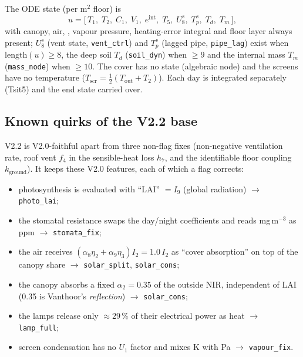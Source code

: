 \documentclass[11pt,a4paper]{article}
\begin{document}
The ODE state (per m$^2$ floor) is
\begin{equation}
u=\bigl[\,T_1,\;T_2,\;C_1,\;V_1,\;e^{\text{int}},\;T_5,\;U_8^{s},\;T_{p}^{s},\;T_{d},\;T_{m}\,\bigr],
\end{equation}
with canopy, air, , vapour pressure, heating-error integral and floor layer always present;
$U_8^s$ (vent state, \texttt{vent\_ctrl}) and $T_p^s$ (lagged pipe, \texttt{pipe\_lag}) exist when
$\mathrm{length}(u)\ge 8$, the deep soil $T_d$ (\texttt{soil\_dyn}) when $\ge 9$ and the internal mass $T_m$
(\texttt{mass\_node}) when $\ge 10$. The cover has no state (algebraic node) and the screens have no
temperature ($T_{\text{scr}}=\tfrac12(T_{\text{out}}+T_2)$). Each day is integrated separately (Tsit5) and
the end state carried over.

\subsection{Known quirks of the V2.2 base}
V2.2 is V2.0-faithful apart from three non-flag fixes (non-negative ventilation rate, roof vent $f_4$ in
the sensible-heat loss $h_7$, and the identifiable floor coupling $k_{\text{ground}}$). It keeps these V2.0
features, each of which a flag corrects:
\begin{itemize}[nosep]
\item photosynthesis is evaluated with ``LAI'' $=I_9$ (global radiation) \;$\to$ \texttt{photo\_lai};
\item the stomatal resistance swaps the day/night coefficients and reads mg\,m$^{-3}$ as ppm \;$\to$ \texttt{stomata\_fix};
\item the air receives $(\alpha_8\eta_2+\alpha_9\eta_3)I_2=1.0\,I_2$ as ``cover absorption'' on top of the canopy share \;$\to$ \texttt{solar\_split}, \texttt{solar\_cons};
\item the canopy absorbs a fixed $\alpha_2=0.35$ of the outside NIR, independent of LAI (0.35 is Vanthoor's \emph{reflection}) \;$\to$ \texttt{solar\_cons};
\item the lamps release only $\approx 29\,\%$ of their electrical power as heat \;$\to$ \texttt{lamp\_full};
\item screen condensation has no $U_1$ factor and mixes K with Pa \;$\to$ \texttt{vapour\_fix}.
\end{itemize}
\end{document}
